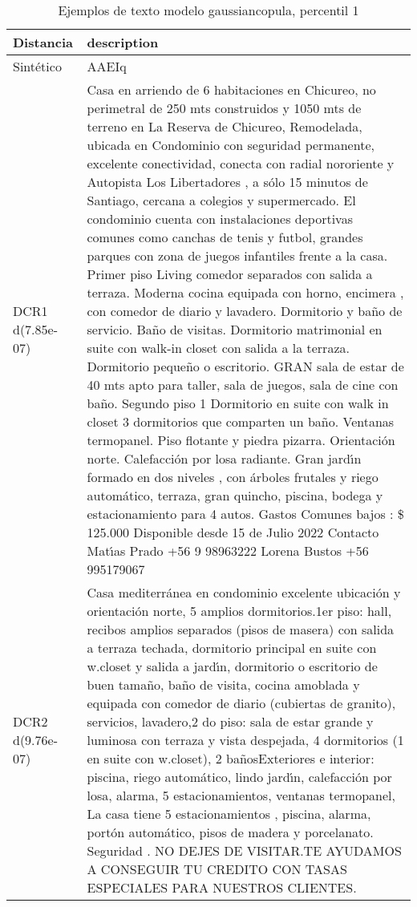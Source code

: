 \begin{table}[H]
\centering
\fontsize{10}{14}\selectfont
\caption{Ejemplos de texto modelo gaussiancopula, percentil 1}
\label{table-example-economicos-a-2-gaussiancopula-1p-text}
\begin{tabular}{|l|m{35em}|}
\hline
\rowcolor[gray]{0.8}
Distancia & description \\
\hline Sintético & AAEIq \\
\hline DCR1 d(7.85e-07) & Casa en arriendo de 6 habitaciones en Chicureo, no perimetral de 250 mts construidos y 1050 mts de terreno en La Reserva de Chicureo, Remodelada, ubicada en Condominio con seguridad permanente, excelente conectividad, conecta con radial nororiente y Autopista Los Libertadores , a s\'olo 15 minutos de Santiago, cercana a colegios y supermercado. El condominio cuenta con instalaciones deportivas comunes como canchas de tenis y futbol, grandes parques con zona de juegos infantiles frente a la casa.
  Primer piso Living comedor separados con salida a terraza. Moderna cocina equipada con horno, encimera , con comedor de diario y lavadero. Dormitorio y ba\~no de servicio. Ba\~no de visitas. Dormitorio matrimonial en suite con walk-in closet con salida a la terraza. Dormitorio peque\~no o escritorio. GRAN sala de estar de 40 mts apto para taller, sala de juegos, sala de cine con ba\~no.  Segundo piso 1 Dormitorio en suite con walk  in closet 3 dormitorios que comparten un ba\~no.  Ventanas termopanel. Piso flotante y piedra pizarra. Orientaci\'on norte. Calefacci\'on por losa radiante. Gran jard{\'\i}n formado en dos niveles , con \'arboles frutales y riego autom\'atico, terraza, gran quincho, piscina, bodega y estacionamiento para 4 autos. Gastos Comunes bajos : \$ 125.000 Disponible desde 15 de Julio 2022 Contacto  Mat{\'\i}as Prado +56 9 98963222 Lorena Bustos +56 995179067 \\
\hline DCR2 d(9.76e-07) & Casa mediterr\'anea en condominio excelente ubicaci\'on y orientaci\'on norte, 5 amplios dormitorios.1er piso: hall, recibos amplios separados (pisos de masera) con salida a terraza techada, dormitorio principal en suite con w.closet y salida a jard{\'\i}n, dormitorio o escritorio de buen tama\~no, ba\~no de visita, cocina amoblada y equipada con comedor de diario (cubiertas de granito), servicios, lavadero,2 do piso: sala de estar grande y luminosa con terraza y vista despejada, 4 dormitorios (1 en suite con w.closet), 2 ba\~nosExteriores e interior: piscina, riego autom\'atico, lindo jard{\'\i}n, calefacci\'on por losa, alarma, 5 estacionamientos, ventanas termopanel, La casa tiene 5 estacionamientos , piscina, alarma, port\'on autom\'atico, pisos de madera y porcelanato. Seguridad . NO DEJES DE VISITAR.TE AYUDAMOS A CONSEGUIR TU CREDITO CON TASAS ESPECIALES PARA NUESTROS CLIENTES. \\
\hline
\end{tabular}
\end{table}
